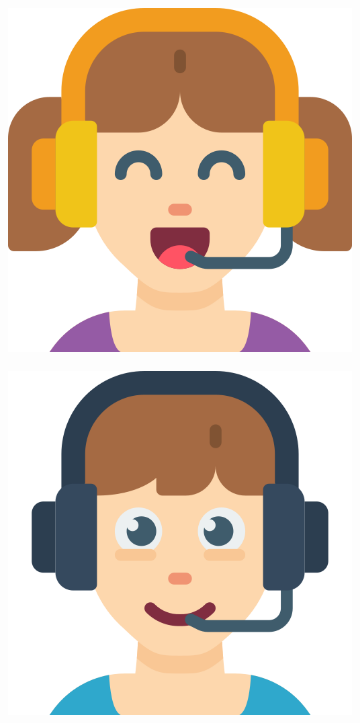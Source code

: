 \begin{figure}[h]
\begin{subfigure}{.1\textwidth}
    \end{subfigure}
    \begin{subfigure}{.1\textwidth}
        \centering
        \includegraphics[width=.8\linewidth]{images/icons/006-gamer.png}
    \end{subfigure}
    \begin{subfigure}{.1\textwidth}
        \centering
        \includegraphics[width=.8\linewidth]{images/icons/007-gamer.png}
    \end{subfigure}
    \begin{subfigure}{.1\textwidth}
        \centering

\end{subfigure}
\end{figure}
